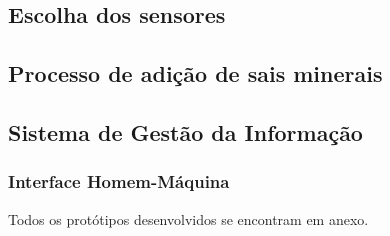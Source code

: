     \subsection{Escolha dos sensores}
      
      
      
      
    
    \pagebreak
    \subsection{Processo de adição de sais minerais}
    
      
    
    \vfill
    
    \pagebreak
    \subsection{Sistema de Gestão da Informação}
      
      
      \subsubsection{Interface Homem-Máquina}
      	Todos os protótipos desenvolvidos se encontram em anexo.

    
    
    
    
    